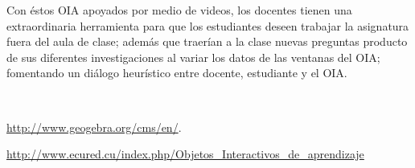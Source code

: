 \begin{titlepage}
\begin{minipage}{0.85\linewidth}
\begin{minipage}{0.85\linewidth}
\begin{resumen}
Con \'estos OIA apoyados por medio de videos, los docentes tienen una extraordinaria herramienta para que los estudiantes deseen trabajar la asignatura fuera del aula de clase; adem\'as que traer\'ian a la clase nuevas preguntas producto de sus diferentes investigaciones al variar los datos de las ventanas del OIA; fomentando un di\'alogo heur\'istico entre docente, estudiante y el OIA.  

    \end{resumen}
\end{minipage}
\vspace*{5pt}\\
\footnotesize
%  
    
\end{minipage}
\vspace{5pt}
\begin{thebibliography}{99}
 \url{http://www.geogebra.org/cms/en/}.

  \url{http://www.ecured.cu/index.php/Objetos_Interactivos_de_aprendizaje}


\end{thebibliography}
\end{titlepage}

